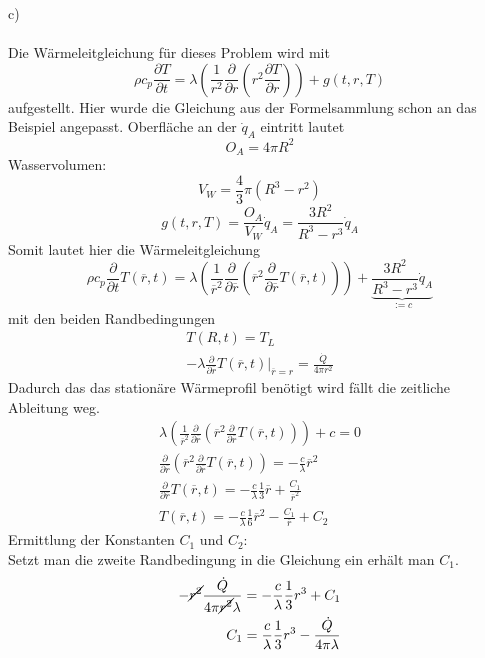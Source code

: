 \newpage
\noindent
c) \\ \\
Die Wärmeleitgleichung für dieses Problem wird mit
\[
	\rho c_p \frac{\partial T}{\partial t} = \lambda\left(\frac{1}{r^2}\frac{\partial}{\partial r}\left(r^2\frac{\partial T}{\partial r}\right)\right) + g(t,r,T)
\]
aufgestellt. Hier wurde die Gleichung aus der Formelsammlung schon an das Beispiel angepasst.
Oberfläche an der $\dot{q}_A$ eintritt lautet
\[
	O_A = 4 \pi R^2
\]
Wasservolumen:
\[
	V_W = \frac{4}{3}\pi \left(R^3 - r^2\right)
\]
\[
	g(t,r,T) = \frac{O_A}{V_W} \dot{q}_A = \frac{3R^2}{R^3 - r^3} \dot{q}_A
\]
Somit lautet hier die Wärmeleitgleichung
\[
	\rho c_p \frac{\partial}{\partial t} T(\overline{r},t) = \lambda\left(\frac{1}{\overline{r}^2}\frac{\partial}{\partial \overline{r}}\left(\overline{r}^2\frac{\partial}{\partial \overline{r}}T(\overline{r},t)\right)\right) + \underbrace{\frac{3R^2}{R^3 - r^3} \dot{q}_A}_{:= c}
\]
mit den beiden Randbedingungen
\begin{align*}
	T(R,t) = T_L \\
	-\lambda\frac{\partial}{\partial \overline{r}} T(\overline{r},t)|_{\overline{r} = r} = \frac{\dot{Q}}{4\pi r^2}
\end{align*}
Dadurch das das stationäre Wärmeprofil benötigt wird fällt die zeitliche Ableitung weg.
\begin{align*}
	\lambda\left(\frac{1}{\overline{r}^2}\frac{\partial}{\partial \overline{r}}\left(\overline{r}^2\frac{\partial}{\partial \overline{r}}T(\overline{r},t)\right)\right) + c = 0 \\
	\frac{\partial}{\partial \overline{r}}\left(\overline{r}^2\frac{\partial}{\partial \overline{r}}T(\overline{r},t)\right) = - \frac{c}{\lambda} \overline{r}^2 \\
	\frac{\partial}{\partial \overline{r}}T(\overline{r},t) = -\frac{c}{\lambda}\frac{1}{3}\overline{r} + \frac{C_1}{\overline{r}^2} \\
	T(\overline{r},t) = -\frac{c}{\lambda}\frac{1}{6}\overline{r}^2 - \frac{C_1}{\overline{r}} + C_2
\end{align*}
Ermittlung der Konstanten $C_1$ und $C_2$:\\
Setzt man die zweite Randbedingung in die Gleichung ein erhält man $C_1$.
\begin{align*}
	- \cancel{r^2} \frac{\dot{Q}}{4\pi \cancel{r^2} \lambda} = -\frac{c}{\lambda}\frac{1}{3} r^3 + C_1 \\
	C_1 = \frac{c}{\lambda}\frac{1}{3} r^3 - \frac{\dot{Q}}{4\pi\lambda}
\end{align*}

